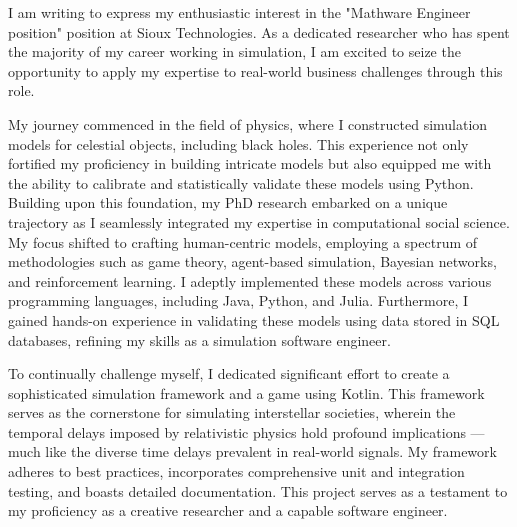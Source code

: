 \documentclass[11pt, a4paper]{awesome-cv}
\begin{document}
\makecvheader[R]

\makecvfooter
  {}%
  {}%
  {}

\makelettertitle

\begin{cvletter}

I am writing to express my enthusiastic interest in the "Mathware Engineer position" position at Sioux Technologies. As a dedicated researcher who has spent the majority of my career working in simulation, I am excited to seize the opportunity to apply my expertise to real-world business challenges through this role.

My journey commenced in the field of physics, where I constructed simulation models for celestial objects, including black holes. This experience not only fortified my proficiency in building intricate models but also equipped me with the ability to calibrate and statistically validate these models using Python. Building upon this foundation, my PhD research embarked on a unique trajectory as I seamlessly integrated my expertise in computational social science. My focus shifted to crafting human-centric models, employing a spectrum of methodologies such as game theory, agent-based simulation, Bayesian networks, and reinforcement learning. I adeptly implemented these models across various programming languages, including Java, Python, and Julia. Furthermore, I gained hands-on experience in validating these models using data stored in SQL databases, refining my skills as a simulation software engineer.

To continually challenge myself, I dedicated significant effort to create a sophisticated simulation framework and a game using Kotlin. This framework serves as the cornerstone for simulating interstellar societies, wherein the temporal delays imposed by relativistic physics hold profound implications — much like the diverse time delays prevalent in real-world signals. My framework adheres to best practices, incorporates comprehensive unit and integration testing, and boasts detailed documentation. This project serves as a testament to my proficiency as a creative researcher and a capable software engineer.


\end{cvletter}
\end{document}
